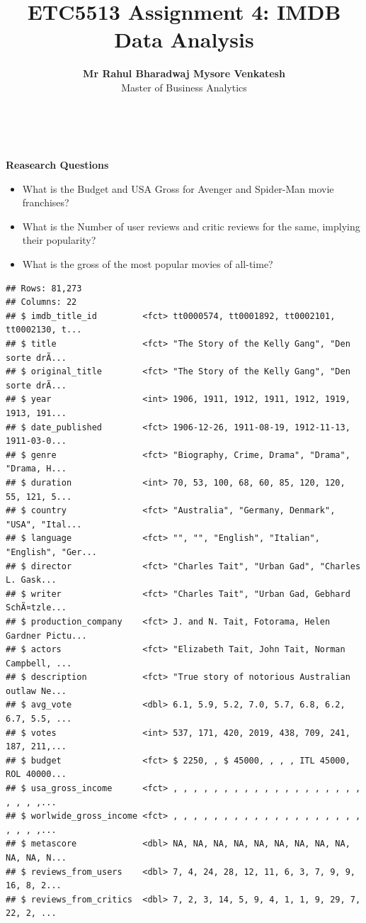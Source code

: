 \documentclass[11pt,a4paper,]{article}
\title{ETC5513 Assignment 4: IMDB Data Analysis}
\author{\sf\Large\textbf{Mr Rahul Bharadwaj Mysore Venkatesh}\\ {\sf\large Master of Business Analytics\\[0.5cm]}}
\date{\sf\Date~\Month~\Year}
\makeatletter
\def\titlepage{\front{\expandafter{\@title}}{\@author}{\@organization}}
\makeatother
\begin{document}
\titlepage

\textbf{Reasearch Questions}

\begin{itemize}
\item
  What is the Budget and USA Gross for Avenger and Spider-Man movie franchises?
\item
  What is the Number of user reviews and critic reviews for the same, implying their popularity?
\item
  What is the gross of the most popular movies of all-time?
\end{itemize}

\begin{verbatim}
## Rows: 81,273
## Columns: 22
## $ imdb_title_id         <fct> tt0000574, tt0001892, tt0002101, tt0002130, t...
## $ title                 <fct> "The Story of the Kelly Gang", "Den sorte drÃ...
## $ original_title        <fct> "The Story of the Kelly Gang", "Den sorte drÃ...
## $ year                  <int> 1906, 1911, 1912, 1911, 1912, 1919, 1913, 191...
## $ date_published        <fct> 1906-12-26, 1911-08-19, 1912-11-13, 1911-03-0...
## $ genre                 <fct> "Biography, Crime, Drama", "Drama", "Drama, H...
## $ duration              <int> 70, 53, 100, 68, 60, 85, 120, 120, 55, 121, 5...
## $ country               <fct> "Australia", "Germany, Denmark", "USA", "Ital...
## $ language              <fct> "", "", "English", "Italian", "English", "Ger...
## $ director              <fct> "Charles Tait", "Urban Gad", "Charles L. Gask...
## $ writer                <fct> "Charles Tait", "Urban Gad, Gebhard SchÃ¤tzle...
## $ production_company    <fct> J. and N. Tait, Fotorama, Helen Gardner Pictu...
## $ actors                <fct> "Elizabeth Tait, John Tait, Norman Campbell, ...
## $ description           <fct> "True story of notorious Australian outlaw Ne...
## $ avg_vote              <dbl> 6.1, 5.9, 5.2, 7.0, 5.7, 6.8, 6.2, 6.7, 5.5, ...
## $ votes                 <int> 537, 171, 420, 2019, 438, 709, 241, 187, 211,...
## $ budget                <fct> $ 2250, , $ 45000, , , , ITL 45000, ROL 40000...
## $ usa_gross_income      <fct> , , , , , , , , , , , , , , , , , , , , , , ,...
## $ worlwide_gross_income <fct> , , , , , , , , , , , , , , , , , , , , , , ,...
## $ metascore             <dbl> NA, NA, NA, NA, NA, NA, NA, NA, NA, NA, NA, N...
## $ reviews_from_users    <dbl> 7, 4, 24, 28, 12, 11, 6, 3, 7, 9, 9, 16, 8, 2...
## $ reviews_from_critics  <dbl> 7, 2, 3, 14, 5, 9, 4, 1, 1, 9, 29, 7, 22, 2, ...
\end{verbatim}
\end{document}
